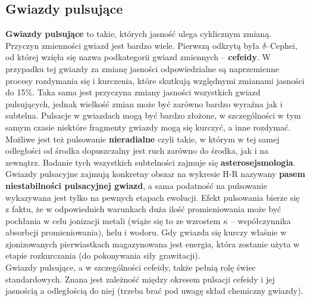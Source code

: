 \documentclass[../index.tex]{subfiles}
\begin{document}
        \subsection{Gwiazdy pulsujące}
            \textbf{Gwiazdy pulsujące} to takie, których jasność ulega cyklicznym zmianą. Przyczyn zmienności gwiazd jest bardzo wiele. Pierwszą odkrytą była \(\delta\)–Cephei, od której wzięła się nazwa podkategorii gwiazd zmiennych – \textbf{cefeidy}. W przypadku tej gwiazdy za zmianę jasności odpowiedzialne są naprzemienne procesy rozdymania się i kurczenia, które skutkują względnymi zmianami jasności do 15\%. Taka sama jest przyczyna zmiany jasności wszystkich gwiazd pulsujących, jednak wielkość zmian może być zarówno bardzo wyraźna jak i subtelna. Pulsacje w gwiazdach mogą być bardzo złożone, w szczególności w tym samym czasie niektóre fragmenty gwiazdy mogą się kurczyć, a inne rozdymać. Możliwe jest też pulsowanie \textbf{nieradialne} czyli takie, w którym w tej samej odległości od środka dopuszczalny jest ruch zarówno do środka, jak i na zewnątrz. Badanie tych wszystkich subtelności zajmuje się \textbf{asterosejsmologia}.\\
            Gwiazdy pulsacyjne zajmują konkretny obszar na wykresie H-R nazywany \textbf{pasem niestabilności pulsacyjnej gwiazd}, a sama podatność na pulsowanie wykazywana jest tylko na pewnych etapach ewolucji. Efekt pulsowania bierze się z faktu, że w odpowiednich warunkach duża ilość promieniowania może być pochłania w celu jonizacji metali (wiąże się to ze wzrostem \(\kappa\) – współczynnika absorbcji promieniowania), helu i wodoru. Gdy gwiazda się kurczy właśnie w zjonizowanych pierwiastkach magazynowana jest energia, która zostanie użyta w etapie rozkurczania (do pokonywania siły grawitacji).\\
            Gwiazdy pulsujące, a w szczególności cefeidy, także pełnią rolę świec standardowych. Znana jest zależność między okresem pulsacji cefeidy i jej jasnością a odległością do niej (trzeba brać pod uwagę skład chemiczny gwiazdy).
\end{document}
